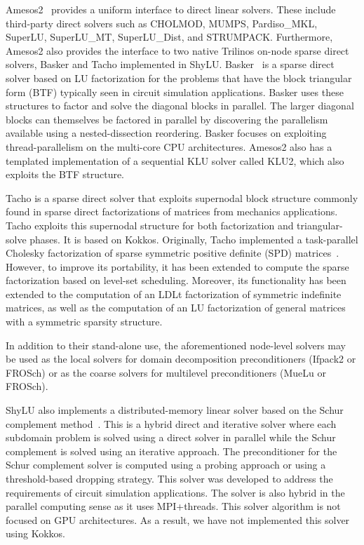 Amesos2~\cite{Bavier2012a} provides a uniform interface to direct linear solvers.
These include third-party direct solvers such as CHOLMOD, MUMPS, Pardiso\_MKL, SuperLU, SuperLU\_MT, SuperLU\_Dist, and STRUMPACK.
Furthermore, Amesos2 also provides the interface to two native Trilinos on-node sparse direct solvers, Basker and Tacho implemented in ShyLU.
Basker~\cite{Basker2017} is a sparse direct solver based on LU factorization for the problems that have the block triangular form (BTF) typically seen in circuit simulation applications. Basker uses these structures to factor and solve the diagonal blocks in parallel. The larger diagonal blocks can themselves be factored in parallel by discovering the parallelism available using a nested-dissection reordering. Basker focuses on exploiting thread-parallelism on the multi-core CPU architectures. %
Amesos2 also has a templated implementation of a sequential KLU solver called KLU2, which also exploits the BTF structure.

Tacho is a sparse direct solver that exploits supernodal block structure commonly found in sparse direct factorizations of matrices from mechanics applications. Tacho exploits this supernodal structure for both factorization and triangular-solve phases. It is based on Kokkos. Originally, Tacho implemented a task-parallel Cholesky factorization of sparse symmetric positive definite (SPD) matrices~\cite{Tacho2018}. However, to improve its portability, it has been extended to compute the sparse factorization based on level-set scheduling. Moreover, its functionality has been extended to the computation of an LDLt factorization of symmetric indefinite matrices, as well as the computation of an LU factorization of general matrices with a symmetric sparsity structure.

In addition to their stand-alone use, the aforementioned node-level solvers may be used as the local solvers for domain decomposition preconditioners (Ifpack2 or FROSch) or as the coarse solvers for multilevel preconditioners (MueLu or FROSch).

ShyLU also implements a distributed-memory linear solver based on the Schur complement method~\cite{ShyLUCore2014}. This is a hybrid direct and iterative solver where each subdomain problem is solved using a direct solver in parallel while the Schur complement is solved using an iterative approach. The preconditioner for the Schur complement solver is computed using a probing approach or using a threshold-based dropping strategy. This solver was developed to address the requirements of circuit simulation applications. The solver is also hybrid in the parallel computing sense as it uses MPI+threads. This  solver algorithm is not focused on GPU architectures. As a result, we have not implemented this solver using Kokkos. %


